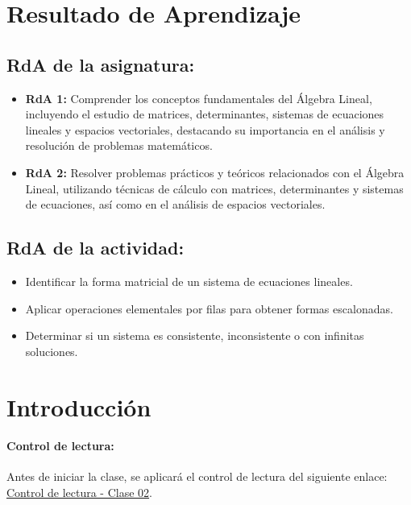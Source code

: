 \documentclass[a4,11pt]{aleph-notas}
\begin{document}
\encabezado

\section*{Resultado de Aprendizaje}

\subsection*{RdA de la asignatura:}
\begin{itemize}[leftmargin=*]
    \item \textbf{RdA 1:} Comprender los conceptos fundamentales del Álgebra Lineal, incluyendo el estudio de matrices, determinantes, sistemas de ecuaciones lineales y espacios vectoriales, destacando su importancia en el análisis y resolución de problemas matemáticos.
    \item \textbf{RdA 2:} Resolver problemas prácticos y teóricos relacionados con el Álgebra Lineal, utilizando técnicas de cálculo con matrices, determinantes y sistemas de ecuaciones, así como en el análisis de espacios vectoriales.
\end{itemize}

\subsection*{RdA de la actividad:}
\begin{itemize}[leftmargin=*]
    \item Identificar la forma matricial de un sistema de ecuaciones lineales.
    \item Aplicar operaciones elementales por filas para obtener formas escalonadas.
    \item Determinar si un sistema es consistente, inconsistente o con infinitas soluciones.
\end{itemize}

\section*{Introducción}

\paragraph{Control de lectura:}
Antes de iniciar la clase, se aplicará el control de lectura del siguiente enlace:
\href{https://gemini.google.com/share/def9847cb644}{Control de lectura - Clase 02}.
\end{document}
